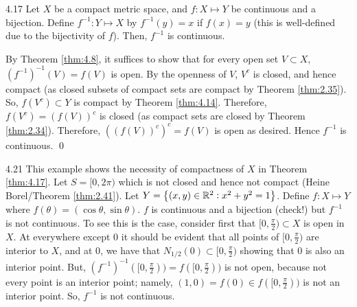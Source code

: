 \begin{theorem}{}{4.17}
    Let $X$ be a compact metric space, and $f: X \mapsto Y$ be continuous and a bijection. Define $f^{-1}: Y \mapsto X$ by $f^{-1}(y) = x$ if $f(x) = y$ (this is well-defined due to the bijectivity of $f$). Then, $f^{-1}$ is continuous.
\end{theorem}
\begin{nproof}
    By Theorem \ref{thm:4.8}, it suffices to show that for every open set $V \subset X$, $\left(f^{-1}\right)^{-1}(V) = f(V)$ is open. By the openness of $V$, $V^c$ is closed, and hence compact (as closed subsets of compact sets are compact by Theorem \ref{thm:2.35}). So, $f(V^c) \subset Y$ is compact by Theorem \ref{thm:4.14}. Therefore, $f(V^c) = \left(f(V)\right)^c$ is closed (as compact sets are closed by Theorem \ref{thm:2.34}). Therefore, $\left(\left(f(V)\right)^c\right)^c = f(V)$ is open as desired. Hence $f^{-1}$ is continuous. \qed
\end{nproof}

\setcounter{rudin}{20}
\begin{example}{}{4.21}
    This example shows the necessity of compactness of $X$ in Theorem \ref{thm:4.17}. Let $S = [0, 2\pi)$ which is not closed and hence not compact (Heine Borel/Theorem \ref{thm:2.41}). Let $Y = \set{(x, y) \in \mathbb{R}^2: x^2 + y^2 = 1}$. Define $f: X \mapsto Y$ where $f(\theta) = (\cos\theta, \sin\theta)$. $f$ is continuous and a bijection (check!) but $f^{-1}$ is not continuous. To see this is the case, consider first that $[0, \frac{\pi}{2}) \subset X$ is open in $X$. At everywhere except $0$ it should be evident that all points of $[0, \frac{\pi}{2})$ are interior to $X$, and at $0$, we have that $N_{1/2}(0) \subset [0, \frac{\pi}{2})$ showing that $0$ is also an interior point. But, $(f^{-1})^{-1}([0, \frac{\pi}{2})) = f([0, \frac{\pi}{2}))$ is not open, because not every point is an interior point; namely, $(1, 0) = f(0) \in f([0, \frac{\pi}{2}))$ is not an interior point. So, $f^{-1}$ is not continuous.
\end{example}

